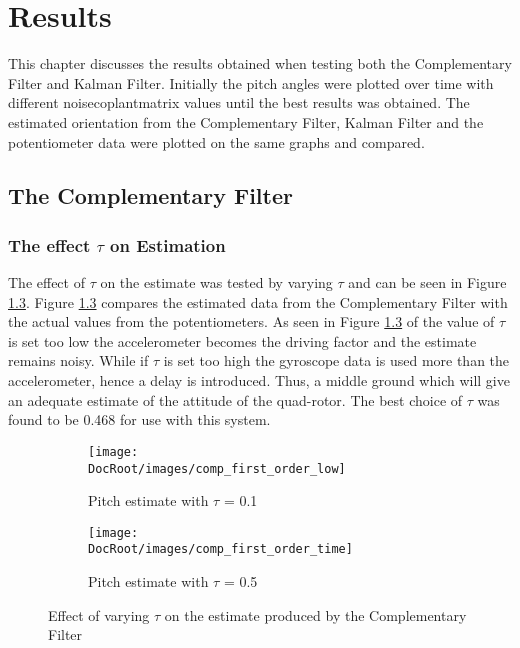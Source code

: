 \chapter{Results}



This chapter discusses the results obtained when testing both the Complementary Filter and Kalman Filter. Initially the pitch angles were plotted over time with different \gls{noisecoplantmatrix} values until the best results was obtained. The estimated orientation from the Complementary Filter, Kalman Filter and the potentiometer data were plotted on the same graphs and compared.

\section{The Complementary Filter}
\subsection{The effect $\tau$ on Estimation}
The effect of $\tau$ on the estimate was tested by varying $\tau$ and can be seen in Figure \ref{fig effect of tau on filter}. Figure \ref{fig effect of tau on filter} compares the estimated data from the Complementary Filter with the actual values from the potentiometers. As seen in Figure \ref{fig effect of tau on filter} of the value of $\tau$ is set too low the accelerometer becomes the driving factor and the estimate remains noisy. While if $\tau$ is set too high the gyroscope data is used more than the accelerometer, hence a delay is introduced. Thus, a middle ground which will give an adequate estimate of the attitude of the quad-rotor. The best choice of $\tau$ was found to be 0.468 for use with this system. 


\begin{figure}[h]
	\centering
	\begin{subfigure}{0.32\textwidth}
		\texttt{[image: \\DocRoot/images/comp\_first\_order\_low]}
		\caption{Pitch estimate with $\tau$ = 0.1}
		\label{Fig:low tau}
	\end{subfigure}%
	\hspace{3cm}
	\begin{subfigure}{0.32\textwidth}
		\texttt{[image: \\DocRoot/images/comp\_first\_order\_time]}
		\caption{Pitch estimate with $\tau$ = 0.5}
		\label{Fig:high tau}
	\end{subfigure}
	\caption{Effect of varying $\tau$ on the estimate produced by the Complementary Filter}	
	\label{fig effect of tau on filter}
\end{figure}


